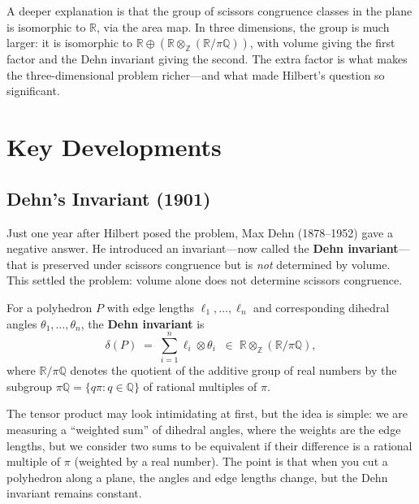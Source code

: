 \begin{remark}
A deeper explanation is that the group of scissors congruence classes in the plane is isomorphic to $\mathbb{R}$, via the area map. In three dimensions, the group is much larger: it is isomorphic to $\mathbb{R} \oplus (\mathbb{R} \otimes_{\mathbb{Z}} (\mathbb{R}/\pi\mathbb{Q}))$, with volume giving the first factor and the Dehn invariant giving the second. The extra factor is what makes the three-dimensional problem richer---and what made Hilbert's question so significant.
\end{remark}

\section{Key Developments}

\subsection{Dehn's Invariant (1901)}

Just one year after Hilbert posed the problem, Max Dehn (1878--1952) gave a negative answer. He introduced an invariant---now called the \textbf{Dehn invariant}---that is preserved under scissors congruence but is \emph{not} determined by volume. This settled the problem: volume alone does not determine scissors congruence.

\begin{definition}
For a polyhedron $P$ with edge lengths $\ell_1, \ldots, \ell_n$ and corresponding dihedral angles $\theta_1, \ldots, \theta_n$, the \textbf{Dehn invariant} is
\[
    \delta(P) \;=\; \sum_{i=1}^{n} \ell_i \otimes \theta_i \;\;\in\; \mathbb{R} \otimes_{\mathbb{Z}} (\mathbb{R}/\pi\mathbb{Q}),
\]
where $\mathbb{R}/\pi\mathbb{Q}$ denotes the quotient of the additive group of real numbers by the subgroup $\pi\mathbb{Q} = \{q\pi : q \in \mathbb{Q}\}$ of rational multiples of $\pi$.
\end{definition}

The tensor product may look intimidating at first, but the idea is simple: we are measuring a ``weighted sum'' of dihedral angles, where the weights are the edge lengths, but we consider two sums to be equivalent if their difference is a rational multiple of $\pi$ (weighted by a real number). The point is that when you cut a polyhedron along a plane, the angles and edge lengths change, but the Dehn invariant remains constant.

